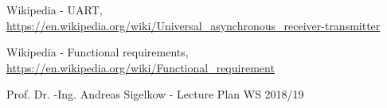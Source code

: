 \documentclass[a4paper, twoside]{report}
\begin{document}
\begin{thebibliography}{1}

\begin{flushleft}
Wikipedia - UART, \url{https://en.wikipedia.org/wiki/Universal_asynchronous_receiver-transmitter}
\end{flushleft} 

\begin{flushleft}
Wikipedia - Functional requirements, \url{https://en.wikipedia.org/wiki/Functional_requirement}
\end{flushleft}

\begin{flushleft}
Prof. Dr. -Ing. Andreas Sigelkow - Lecture Plan WS 2018/19
\end{flushleft}  
\end{thebibliography}
\end{document}
